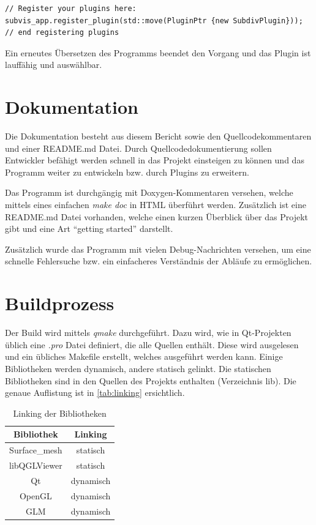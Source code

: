 \begin{lstlisting}[style=myCppStyle, caption={Registrierung eines Plugins}, label=lst:plugin_register]
// Register your plugins here:
subvis_app.register_plugin(std::move(PluginPtr {new SubdivPlugin}));
// end registering plugins
\end{lstlisting}

Ein erneutes Übersetzen des Programms beendet den Vorgang und das Plugin ist lauffähig und auswählbar.

\section{Dokumentation}

Die Dokumentation besteht aus diesem Bericht sowie den Quellcodekommentaren und einer README.md Datei.
Durch Quellcodedokumentierung sollen Entwickler befähigt werden schnell in das Projekt einsteigen zu können und das Programm weiter zu entwickeln bzw. durch Plugins zu erweitern.

Das Programm ist durchgängig mit Doxygen-Kommentaren versehen, welche mittels eines einfachen \emph{make doc} in HTML überführt werden.
Zusätzlich ist eine README.md Datei vorhanden, welche einen kurzen Überblick über das Projekt gibt und eine Art \enquote{getting started} darstellt.

Zusätzlich wurde das Programm mit vielen Debug-Nachrichten versehen, um eine schnelle Fehlersuche bzw. ein einfacheres Verständnis der Abläufe zu ermöglichen.

\section{Buildprozess}

Der Build wird mittels \emph{qmake} durchgeführt.
Dazu wird, wie in Qt-Projekten üblich eine \emph{.pro} Datei definiert, die alle Quellen enthält. 
Diese wird ausgelesen und ein übliches Makefile erstellt, welches ausgeführt werden kann.
Einige Bibliotheken werden dynamisch, andere statisch gelinkt. 
Die statischen Bibliotheken sind in den Quellen des Projekts enthalten (Verzeichnis lib).
Die genaue Auflistung ist in \autoref{tab:linking} ersichtlich.

\begin{table}[h]
\center
\caption{Linking der Bibliotheken}
\label{tab:linking}
\begin{tabular}{c|c}
Bibliothek & Linking\\
\hline
Surface\_mesh & statisch\\
libQGLViewer & statisch\\
Qt & dynamisch\\
OpenGL & dynamisch\\
GLM & dynamisch\\
\end{tabular}
\end{table}

